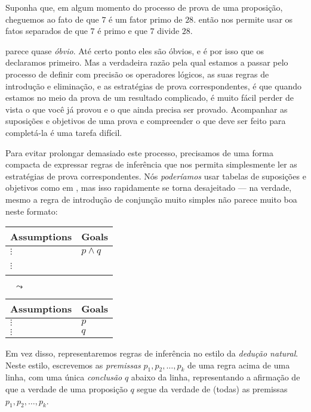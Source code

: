 \begin{itemizar}
\begin{example}
\label{exSevenDividesTwentyEightConjunctionAssumption}
Suponha que, em algum momento do processo de prova de uma proposição, cheguemos ao fato de que $7$ é um fator primo de $28$.  então nos permite usar os fatos separados de que $7$ é primo e que $7$ divide $28$.
\end{example}

 parece quase \textit{óbvio}. Até certo ponto eles são óbvios, e é por isso que os declaramos primeiro. Mas a verdadeira razão pela qual estamos a passar pelo processo de definir com precisão os operadores lógicos, as suas regras de introdução e eliminação, e as estratégias de prova correspondentes, é que quando estamos no meio da prova de um resultado complicado, é muito fácil perder de vista o que você já provou e o que ainda precisa ser provado. Acompanhar as suposições e objetivos de uma prova e compreender o que deve ser feito para completá-la é uma tarefa difícil.

Para evitar prolongar demasiado este processo, precisamos de uma forma compacta de expressar regras de inferência que nos permita simplesmente ler as estratégias de prova correspondentes. Nós \textit{poderíamos} usar tabelas de suposições e objetivos como em , mas isso rapidamente se torna desajeitado --- na verdade, mesmo a regra de introdução de conjunção muito simples \introrule{\wedge} não parece muito boa neste formato:
\begin{center}
\begin{tabular}{C{60pt}|C{60pt}}
{\small \textbf{Assumptions}} & {\small \textbf{Goals}} \\ \hline
$\vdots$ & $p \wedge q$ \\
$\vdots$ & ~
\end{tabular}
$\quad \leadsto \quad$
\begin{tabular}{C{60pt}|C{60pt}}
{\small \textbf{Assumptions}} & \small{\textbf{Goals}} \\ \hline
$\vdots$ & $p$ \\
$\vdots$ & $q$
\end{tabular}
\end{center}

Em vez disso, representaremos regras de inferência no estilo da \textit{dedução natural}. Neste estilo, escrevemos as \textit{premissas} $p_1,p_2,\dots,p_k$ de uma regra acima de uma linha, com uma única \textit{conclusão} $q$ abaixo da linha, representando a afirmação de que a verdade de uma proposição $q$ segue da verdade de (todas) as premissas $p_1,p_2,\dots,p_k$.


\end{itemizar}
